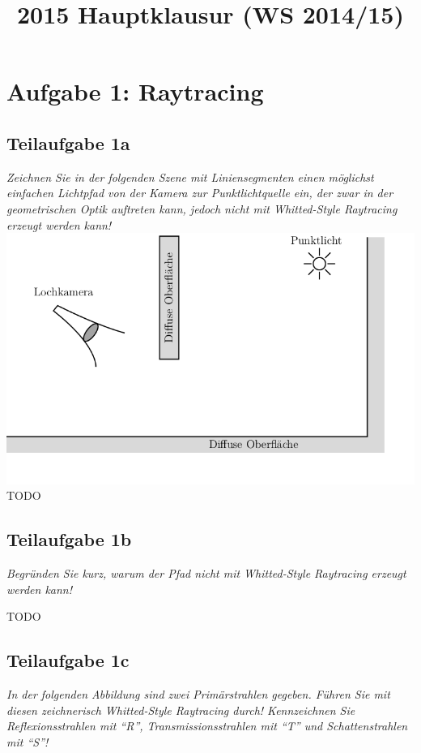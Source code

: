 \documentclass[a4paper]{scrartcl}
\begin{document}
\title{2015 Hauptklausur (WS 2014/15)}

\setcounter{section}{1}
\section*{Aufgabe 1: Raytracing}
\subsection*{Teilaufgabe 1a}
\textit{Zeichnen Sie in der folgenden Szene mit Liniensegmenten einen möglichst einfachen
Lichtpfad von der Kamera zur Punktlichtquelle ein, der zwar in der geometrischen
Optik auftreten kann, jedoch nicht mit Whitted-Style Raytracing erzeugt werden kann!}
\includegraphics*[width=\linewidth, keepaspectratio]{1a.png}
TODO

\subsection*{Teilaufgabe 1b}
\textit{Begründen Sie kurz, warum der Pfad nicht mit Whitted-Style Raytracing
erzeugt werden kann!}

TODO

\subsection*{Teilaufgabe 1c}
\textit{In der folgenden Abbildung sind zwei Primärstrahlen gegeben. Führen Sie
mit diesen zeichnerisch Whitted-Style Raytracing durch! Kennzeichnen Sie
Reflexionsstrahlen mit \enquote{R}, Transmissionsstrahlen mit \enquote{T} und
Schattenstrahlen mit \enquote{S}!}
\end{document}
